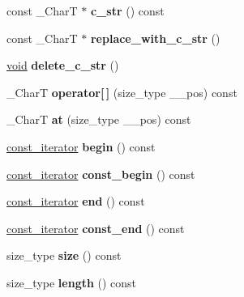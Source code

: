 \begin{DoxyCompactItemize}
const \+\_\+\+CharT $\ast$ {\bfseries c\+\_\+str} () const
\item 
\mbox{\label{classrope_a6dd442da926ff7da5ac683c0688f9b42}} 
const \+\_\+\+CharT $\ast$ {\bfseries replace\+\_\+with\+\_\+c\+\_\+str} ()
\item 
\mbox{\label{classrope_ae396c49f2874eb6c26031456ab87b8fd}} 
\hyperlink{interfacevoid}{void} {\bfseries delete\+\_\+c\+\_\+str} ()
\item 
\mbox{\label{classrope_a80a272c0123ff71120f1085636ecf0ad}} 
\+\_\+\+CharT {\bfseries operator\mbox{[}$\,$\mbox{]}} (size\+\_\+type \+\_\+\+\_\+pos) const
\item 
\mbox{\label{classrope_a412792bea919dc2d91e0d51f98c700f2}} 
\+\_\+\+CharT {\bfseries at} (size\+\_\+type \+\_\+\+\_\+pos) const
\item 
\mbox{\label{classrope_a1e9ee877306d00eaee7a036ff0ec4863}} 
\hyperlink{class___rope__const__iterator}{const\+\_\+iterator} {\bfseries begin} () const
\item 
\mbox{\label{classrope_a4493696a55fc67e7b2820dcf8c8576d7}} 
\hyperlink{class___rope__const__iterator}{const\+\_\+iterator} {\bfseries const\+\_\+begin} () const
\item 
\mbox{\label{classrope_a75667889062d02647d656b48babab25c}} 
\hyperlink{class___rope__const__iterator}{const\+\_\+iterator} {\bfseries end} () const
\item 
\mbox{\label{classrope_a4f92fbac954113602b008a60e53c2cdc}} 
\hyperlink{class___rope__const__iterator}{const\+\_\+iterator} {\bfseries const\+\_\+end} () const
\item 
\mbox{\label{classrope_ae8720114c37db5e80d52474c68a4e58d}} 
size\+\_\+type {\bfseries size} () const
\item 
\mbox{\label{classrope_a5bbf53b2f777897f55e5d5968ca1a3ff}} 
size\+\_\+type {\bfseries length} () const
\item 
\mbox{\label{classrope_acfda4ae7e427ed3bed318af88e0c5668}} 

\end{DoxyCompactItemize}
